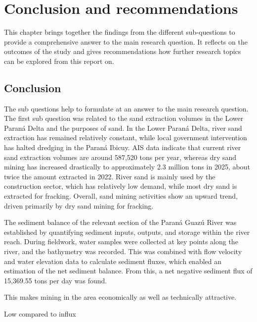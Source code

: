 \chapter{Conclusion and recommendations}
\label{chapter:conclusion}
This chapter brings together the findings from the different sub-questions to provide a comprehensive answer to the main research question. It reflects on the outcomes of the study and gives recommendations how further research topics can be explored from this report on.

\section{Conclusion}
The sub questions help to formulate at an answer to the main research question. The first sub question was related to the sand extraction volumes in the Lower Paraná Delta and the purposes of sand. In the Lower Paraná Delta, river sand extraction has remained relatively constant, while local government intervention has halted dredging in the Paraná Ibicuy. AIS data indicate that current river sand extraction volumes are around 587,520 tons per year, whereas dry sand mining has increased drastically to approximately 2.3 million tons in 2025, about twice the amount extracted in 2022. River sand is mainly used by the construction sector, which has relatively low demand, while most dry sand is extracted for fracking. Overall, sand mining activities show an upward trend, driven primarily by dry sand mining for fracking.

The sediment balance of the relevant section of the Paraná Guazú River was established by quantifying sediment inputs, outputs, and storage within the river reach. During fieldwork, water samples were collected at key points along the river, and the bathymetry was recorded. This was combined with flow velocity and water elevation data to calculate sediment fluxes, which enabled an estimation of the net sediment balance. From this, a net negative sediment flux of 15,369.55 tons per day was found.


This makes mining in the area economically as well as technically attractive.


Low compared to influx







